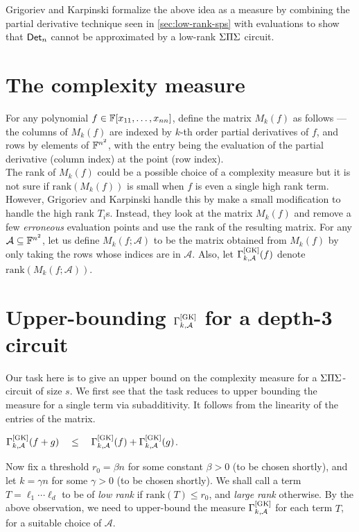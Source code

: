 Grigoriev and Karpinski \cite{grigoriev98} formalize the above idea as
a measure by combining the partial derivative technique seen in
\autoref{sec:low-rank-sps} with evaluations to show that $\mathsf{Det}_n$
cannot be approximated by a low-rank $\Sigma\Pi\Sigma$ circuit.

\section{The complexity measure}

For any polynomial $f \in \mathbb{F}[x_{11},\dots, x_{nn}]$, define the matrix
$M_k(f)$ as follows --- the columns of $M_k(f)$ are indexed by $k$-th
order partial derivatives of $f$, and rows by elements of $\mathbb{F}^{n^2}$,
with the entry being the evaluation of the partial derivative (column
index) at the point (row index).\\

The rank of $M_k(f)$ could be a possible choice of a complexity
measure but it is not sure if $\mathrm{rank}(M_k(f))$ is small when
$f$ is even a single high rank term. However, Grigoriev and Karpinski
handle this by make a small modification to handle the high rank
$T_i$s. Instead, they look at the matrix $M_k(f)$ and remove a few
\emph{erroneous} evaluation points and use the rank of the resulting
matrix. For any $\mathcal{A}\subseteq \mathbb{F}^{n^2}$, let us define
$M_k(f;\mathcal{A})$ to be the matrix obtained from $M_k(f)$ by only
taking the rows whose indices are in $\mathcal{A}$. Also, let
$\Gamma^{\mathrm{[GK]}}_{k,\mathcal{A}}(f)$ denote
$\mathrm{rank}(M_k(f;\mathcal{A}))$.



\section{Upper-bounding $\Gamma^{\mathrm{[GK]}}_{k,\mathcal{A}}$ for a depth-3 circuit}\label{sec:gk-upper-bound}

Our task here is to give an upper bound on the complexity measure for
a $\Sigma\Pi\Sigma$-circuit of size $s$. We first see that the task reduces to
upper bounding the measure for a single term via subadditivity. It
follows from the linearity of the entries of the matrix.

\begin{observation}\label{obs:GK-subadditivity}
  $\Gamma^{\mathrm{[GK]}}_{k,\mathcal{A}}(f + g) \quad\leq\quad
  \Gamma^{\mathrm{[GK]}}_{k,\mathcal{A}}(f) + \Gamma^{\mathrm{[GK]}}_{k,\mathcal{A}}(g)$.
\end{observation}

Now fix a threshold $r_0 = \beta n$ for some constant $\beta > 0$ (to
be chosen shortly), and let $k = \gamma n$ for some $\gamma>0$ (to be
chosen shortly). We shall call a term $T = \ell_1\cdots \ell_d$ to be
of \emph{low rank} if $\mathrm{rank}(T) \leq r_0$, and \emph{large
  rank} otherwise. By the above observation, we need to upper-bound
the measure $\Gamma^{\mathrm{[GK]}}_{k,\mathcal{A}}$ for each term $T$, for a
suitable choice of $\mathcal{A}$.\\

